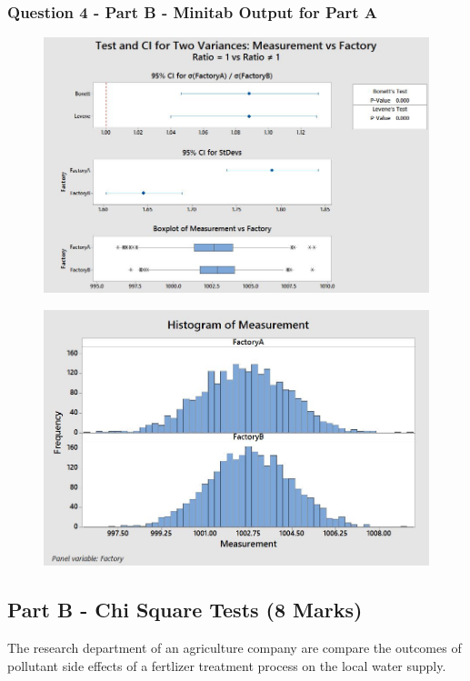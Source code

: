 \documentclass[a4paper,12pt]{article}
\begin{document}
\subsubsection*{Question 4 - Part B - Minitab Output for Part A}
\begin{figure}[h!]
\centering
\includegraphics[width=0.9\linewidth]{images/TwoFactoryBoxplots}

\end{figure}


\begin{figure}[h!]
\centering
\includegraphics[width=0.9\linewidth]{images/TwoFactoryHistogram}

\end{figure}
\newpage

\subsection*{Part B - Chi Square Tests (8 Marks) }



The research department of an agriculture company are compare the outcomes of pollutant side effects of a fertlizer treatment process on the local water supply. 
\end{document}
